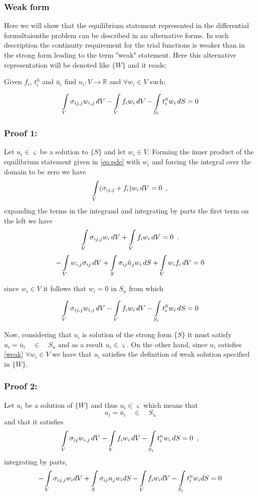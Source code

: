\subsubsection{Weak form}
Here we will show that the equilibrium statement represented in the differential formultaionthe problem can be described in an alternative forms. In such description the continuity requirement for the trial functions is weaker than in the strong form leading to the term "weak" statement. Here this alternative representation will be denoted like $\{W\}$ and it reads;

Given $f_i$, $t_i^{\hat n}$ and ${\bar u_i}$ find ${u_i}:V \to \mathbb{R}$ and $\forall {w_i} \in V$ such:

\[\int\limits_V \sigma _{ij,j} w_{i,j}\, dV - \int\limits_V f_i w_i\, dV  - \int\limits_{S_t} t_i^{\hat n} w_i\, dS = 0\]

\subsubsection*{Proof 1:}
Let $u_i \in \varsigma $ be a solution to $\{S\}$ and let $w_i \in V $. Forming the inner product of the equilibrium statement given in \cref{eq:pde} with $w_i$ and forcing the integral over the domain to be zero we have
%
\[\int\limits_V (\sigma_{ij,j} + f_i ){w_i}\, dV = 0 \enspace ,\]
%
expanding the terms in the integrand and integrating by parts the first term on the left we have
%
\[\int\limits_V \sigma _{ij,j} w_i\, dV + \int\limits_V f_i w_i\, dV = 0 \enspace .\]
\[ - \int\limits_V w_{i,j} \sigma _{ij}\, dV  + \int\limits_S \sigma _{ij} \hat{n}_j w_i\, dS  + \int\limits\limits_V w_i f_i\, dV = 0 \]

since $w_i \in V$ it follows that $w_i = 0$ in $S_u$ from which

\begin{equation}\label{weak}
\int\limits_V \sigma _{ij,j} w_{i,j}\, dV - \int\limits_V f_i w_i\, dV  - \int\limits_{S_t} t_i^{\hat n} w_i\, dS = 0
\end{equation}

Now, considering that $u_i$ is solution of the strong form $\{S\}$ it must satisfy $u_i = \bar u_{i} \quad \in \quad S_u$ and as a result $u_i \in \varsigma$. On the other hand, since $u_i$ satisfies \cref{weak} $\forall {w_i} \in V$ we have that $u_i$ satisfies the definition of weak solution specified in $\{ W \}$.

\subsubsection*{Proof 2:}
Let $u_i$ be a solution of $\{W\}$ and thus $u_i \in \varsigma$ which means that
\[u_i = \bar u_{i} \quad \in \quad S_u\]
and that it satisfies
\[\int\limits_V \sigma _{ij} w_{i,j}\, dV - \int\limits_V f_i w_i\, dV - \int\limits_{S_t} t_i^n w_i\, dS = 0 \enspace ,\]
integrating by parts,
\[-\int\limits_V \sigma_{ij,j} w_idV + \int\limits_S \sigma_{ij} n_j w_i dS  - \int\limits_V f_i w_i dV - \int\limits_{S_t} {t_i^n} w_i dS = 0\]

